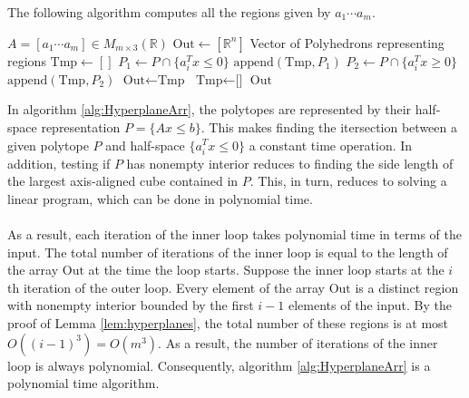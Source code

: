 \documentclass[a4paper]{amsart}
\theoremstyle{remark}
\begin{document}
\noindent
The following algorithm computes all the regions given by $a_1 \cdots a_m$. 
\begin{algorithm}[H]
	\caption{Hyperplane Region Algorithm}\label{alg:HyperplaneArr}
	\begin{algorithmic}
		\Ensure $A = [a_1 \cdots a_m] \in M_{m\times3}(\mathbb{R})$
		\State $\textrm{Out} \gets [\mathbb{R}^n]$
		\Comment Vector of Polyhedrons representing regions
		\State $\textrm{Tmp} \gets []$
		\State $P_1 \gets P\cap \{a_i^Tx \leq 0\}$
		\State $\textrm{append}(\textrm{Tmp},P_1)$
		\EndIf
		\State $P_2 \gets P\cap \{a_i^Tx \geq 0\}$
		\State $\textrm{append}(\textrm{Tmp},P_2)$
		\EndIf
		\EndFor
		\State $\textrm{Out} \gets \textrm{Tmp}$
		\State $\textrm{Tmp} \gets \textrm{[]}$
		\EndFor
		\State \Return $\textrm{Out}$
	\end{algorithmic}
\end{algorithm}
\noindent
In algorithm \ref{alg:HyperplaneArr}, the polytopes are represented by their half-space representation $P=\{Ax \leq b\}$. This makes finding the itersection between a given polytope $P$ and half-space $\{a_i^Tx \leq 0\}$ a constant time operation. In addition, testing if $P$ has nonempty interior reduces to finding the side length of the largest axis-aligned cube contained in $P$. This, in turn, reduces to solving a linear program, which can be done in polynomial time.\\\\
As a result, each iteration of the inner loop takes polynomial time in terms of the input. The total number of iterations of the inner loop is equal to the length of the array $\textrm{Out}$ at the time the loop starts. Suppose the inner loop starts at the $i$th iteration of the outer loop. Every element of the array $\textrm{Out}$ is a distinct region with nonempty interior bounded by the first $i-1$ elements of the input. By the proof of Lemma \ref{lem:hyperplanes}, the total number of these regions is at most $O((i-1)^3)=O(m^3)$. As a result, the number of iterations of the inner loop is always polynomial. Consequently, algorithm \ref{alg:HyperplaneArr} is a polynomial time algorithm.
\\
\end{document}
